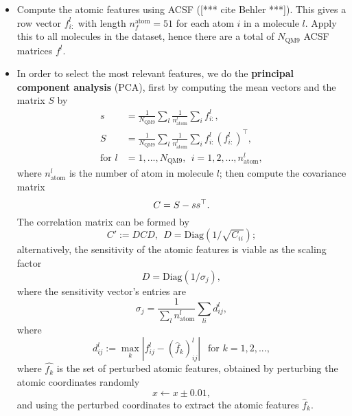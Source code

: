 \documentclass[12pt]{article}
\def\att{                    %
        \marginpar[ \hspace*{\fill} \raisebox{-0.2em}{\rule{2mm}{1.2em}} ]
        {\raisebox{-0.2em}{\rule{2mm}{1.2em}} }
        }
\def\at#1{[*** \att #1 ***]}  %
\begin{document}
\begin{itemize}
	\item Compute the atomic features using ACSF (\at{cite Behler}). This gives a row vector $f^l_{i:}$ with length $n^\text{atom}_f = 51$ for each atom $i$ in a molecule $l$. Apply this to all molecules in the dataset, hence there are a total of $N_\text{QM9}$ ACSF matrices $f^l$.
	\item In order to select the most relevant features, we do the \textbf{principal component analysis} (PCA), first by computing the mean vectors and the matrix $S$ by
	\begin{equation}
		\begin{split}
			s &= \frac{1}{N_\text{QM9}}\sum_{l} \frac{1}{n^l_\text{atom}}\sum_{i} f^l_{i:}, \\ 
			S &= \frac{1}{N_\text{QM9}}\sum_{l} \frac{1}{n^l_\text{atom}} \sum_{i} f^l_{i:} (f^l_{i:})^\top, \\ 
			\text{for } l &= 1,...,N_\text{QM9}, ~~ i = 1,2,...,n^l_\text{atom},
		\end{split}
	\end{equation}
	where $n^l_\text{atom}$ is the number of atom in molecule $l$; then compute the covariance matrix
	\begin{equation}
		\label{eq:pca_atom_start}
		C = S - ss^\top. \\			
	\end{equation}
	The correlation matrix can be formed by
	\begin{equation}
		C' := DCD, ~~ D = \text{Diag}(1/\sqrt{C_{ii}});
	\end{equation}
	alternatively, the sensitivity of the atomic features is viable as the scaling factor
	\begin{equation}
		D = \text{Diag}(1/\sigma_j),
	\end{equation}
	where the sensitivity vector's entries are
	\begin{equation}
		\sigma_j = \frac{1}{\sum_l n^l_\text{atom}}\sum_{li} d^l_{ij},
	\end{equation}
	where
	\begin{equation}
		d^l_{ij} := \max_k |f^l_{ij} - (\hat{f}_k)^l_{ij}|~~\text{ for }k = 1,2,...,
	\end{equation}
	where $\hat{f_k}$ is the set of perturbed atomic features, obtained by perturbing the atomic coordinates randomly
	\begin{equation}
		x \leftarrow x \pm 0.01,
	\end{equation}
	and using the perturbed coordinates to extract the atomic features $\hat{f}_k$.


\end{itemize}
\end{document}
